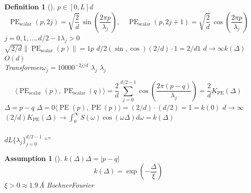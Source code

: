 \documentclass[11pt,a4paper]{article}
\newtheorem{definition}[theorem]{Definition}
\newtheorem{assumption}[theorem]{Assumption}
\theoremstyle{remark}
\DeclareMathOperator{\PE}{PE}
\begin{document}
\subsection{}

\subsubsection{}

\begin{definition}[]
\label{def:1.2.1}
$p \in [0, L]$$d$
\begin{equation}
    \boxed{
    \PE_{\text{scalar}}(p, 2j) = \sqrt{\frac{2}{d}}\,\sin\!\left(\frac{2\pi p}{\lambda_j}\right),\quad
    \PE_{\text{scalar}}(p, 2j+1) = \sqrt{\frac{2}{d}}\,\cos\!\left(\frac{2\pi p}{\lambda_j}\right)
    }
\end{equation}
$j = 0, 1, \ldots, d/2-1$$\lambda_j > 0$\textbf{}\\
$\sqrt{2/d}$$\|\PE_{\text{scalar}}(p)\| = 1$$p$
$d/2$$(\sin,\cos)$$(2/d) \cdot 1 = 2/d$$1$
$d \to \infty$\textbf{}$k(\Delta)$$O(d)$\\
\textbf{}Transformer$\omega_j = 10000^{-2j/d}$
\textbf{}$\lambda_j$
$\lambda_j$
\end{definition}


\begin{equation}
    \langle \PE_{\text{scalar}}(p), \PE_{\text{scalar}}(q) \rangle
    = \frac{2}{d}\sum_{j=0}^{d/2-1} \cos\!\left(\frac{2\pi(p-q)}{\lambda_j}\right)
    = \frac{2}{d}K_{\PE}(\Delta)
\end{equation}
$\Delta = p - q$
$\Delta = 0$$\langle \PE(p), \PE(p) \rangle = (2/d) \cdot (d/2) = 1 = k(0)$
$d \to \infty$$(2/d)K_{\PE}(\Delta) \to \int_0^\infty S(\omega)\cos(\omega\Delta)d\omega = k(\Delta)$

\subsubsection{}

$d$$L$$\{\lambda_j\}_{j=0}^{d/2-1}$
``''

\begin{assumption}[]
\label{ass:1.2.1}
\textbf{}
$k(\Delta)$$\Delta = |p-q|$
\begin{equation}
    k(\Delta) = \exp\!\left(-\frac{\Delta}{\xi}\right)
\end{equation}
$\xi > 0$\textbf{}$\approx 1.9$\,\AA{}
BochnerFourier
\end{assumption}
\end{document}
